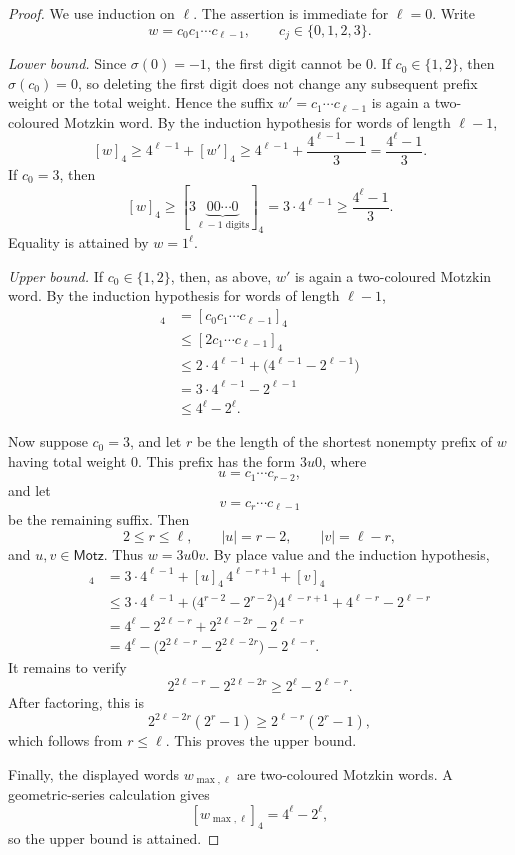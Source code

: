 \documentclass{ws-ijfcs}
\begin{document}
\begin{proof}
We use induction on $\ell$.  The assertion is immediate for $\ell=0$.
Write
\[
 w=c_0c_1\cdots c_{\ell-1},
 \qquad
 c_j\in\{0,1,2,3\}.
\]

\emph{Lower bound.}
Since $\sigma(0)=-1$, the first digit cannot be $0$.  If $c_0\in\{1,2\}$, then $\sigma(c_0)=0$, so deleting the first
digit does not change any subsequent prefix weight or the total weight.
Hence the suffix $w'=c_1\cdots c_{\ell-1}$ is again a two-coloured
Motzkin word.  By the induction hypothesis for words of length $\ell-1$,
\[
  [w]_4\geq4^{\ell-1}+[w']_4
  \geq4^{\ell-1}+\frac{4^{\ell-1}-1}{3}
  =\frac{4^{\ell}-1}{3}.
\]
If $c_0=3$, then
\[
  [w]_4
  \geq[3\underbrace{00\cdots0}_{\ell-1\text{ digits}}]_4
  =3\cdot4^{\ell-1}
  \geq\frac{4^{\ell}-1}{3}.
\]
Equality is attained by $w=1^{\ell}$.

\emph{Upper bound.}
If $c_0\in\{1,2\}$, then, as above, $w'$ is again a two-coloured
Motzkin word.  By the induction hypothesis for words of length $\ell-1$,
\begin{align*}
  [w]_4
  &=[c_0c_1\cdots c_{\ell-1}]_4\\
  &\leq[2c_1\cdots c_{\ell-1}]_4\\
  &\leq2\cdot4^{\ell-1}+\bigl(4^{\ell-1}-2^{\ell-1}\bigr)\\
  &=3\cdot4^{\ell-1}-2^{\ell-1}\\
  &\leq4^{\ell}-2^{\ell}.
\end{align*}

Now suppose $c_0=3$, and let $r$ be the length of the shortest nonempty
prefix of $w$ having total weight $0$.  This prefix has the form $3u0$,
where
\[
 u=c_1\cdots c_{r-2},
\]
and let
\[
 v=c_r\cdots c_{\ell-1}
\]
be the remaining suffix.  Then
\[
 2\leq r\leq\ell,
 \qquad
 |u|=r-2,
 \qquad
 |v|=\ell-r,
\]
and $u,v\in\mathsf{Motz}$.  Thus $w=3u0v$.  By place value and the induction hypothesis,
\begin{align*}
  [w]_4
  &=3\cdot4^{\ell-1}+[u]_4\,4^{\ell-r+1}+[v]_4\\
  &\leq3\cdot4^{\ell-1}
    +\bigl(4^{r-2}-2^{r-2}\bigr)4^{\ell-r+1}
    +4^{\ell-r}-2^{\ell-r}\\
  &=4^{\ell}-2^{2\ell-r}+2^{2\ell-2r}-2^{\ell-r}\\
  &=4^{\ell}-\bigl(2^{2\ell-r}-2^{2\ell-2r}\bigr)-2^{\ell-r}.
\end{align*}
It remains to verify
\[
  2^{2\ell-r}-2^{2\ell-2r}
  \geq2^{\ell}-2^{\ell-r}.
\]
After factoring, this is
\[
  2^{2\ell-2r}(2^r-1)\geq2^{\ell-r}(2^r-1),
\]
which follows from $r\leq\ell$.  This proves the upper bound.

Finally, the displayed words $w_{\max,\ell}$ are two-coloured Motzkin words.
A geometric-series calculation gives
\[
  [w_{\max,\ell}]_4=4^{\ell}-2^{\ell},
\]
so the upper bound is attained.
\end{proof}
\end{document}
